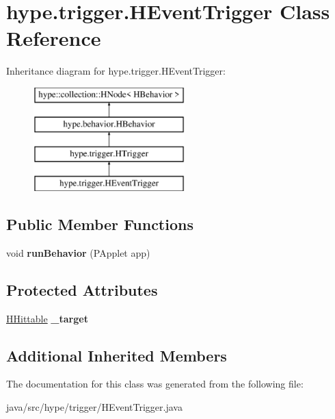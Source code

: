 \hypertarget{classhype_1_1trigger_1_1_h_event_trigger}{\section{hype.\-trigger.\-H\-Event\-Trigger Class Reference}
\label{classhype_1_1trigger_1_1_h_event_trigger}
}
Inheritance diagram for hype.\-trigger.\-H\-Event\-Trigger\-:\begin{figure}[H]
\begin{center}
\leavevmode
\includegraphics[height=4.000000cm]{classhype_1_1trigger_1_1_h_event_trigger}
\end{center}
\end{figure}
\subsection*{Public Member Functions}
\begin{DoxyCompactItemize}
\item 
\hypertarget{classhype_1_1trigger_1_1_h_event_trigger_acca150cb7022ffb1891f102cd059d505}{void {\bfseries run\-Behavior} (P\-Applet app)}\label{classhype_1_1trigger_1_1_h_event_trigger_acca150cb7022ffb1891f102cd059d505}

\end{DoxyCompactItemize}
\subsection*{Protected Attributes}
\begin{DoxyCompactItemize}
\item 
\hypertarget{classhype_1_1trigger_1_1_h_event_trigger_a0f0f0c596dbb7f01d82a7fca07cb54a5}{\hyperlink{interfacehype_1_1interfaces_1_1_h_hittable}{H\-Hittable} {\bfseries \-\_\-target}}\label{classhype_1_1trigger_1_1_h_event_trigger_a0f0f0c596dbb7f01d82a7fca07cb54a5}

\end{DoxyCompactItemize}
\subsection*{Additional Inherited Members}


The documentation for this class was generated from the following file\-:\begin{DoxyCompactItemize}
\item 
java/src/hype/trigger/H\-Event\-Trigger.\-java\end{DoxyCompactItemize}
